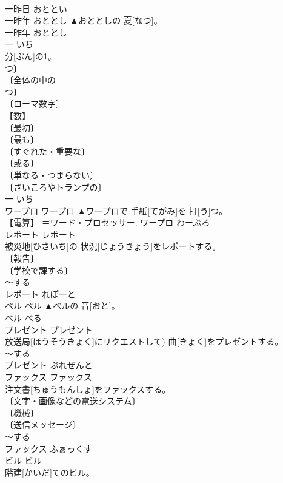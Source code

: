 \documentclass[8pt]{extreport}
\begin{document}
\begin{CJK}{UTF8}{min}
\\	[＝おととい]	一昨日	おととい	
\\	一昨年	おととし	▲おととしの 夏[なつ]。	
\\	一昨年	おととし	
\\	一	いち	
\\	分[ぶん]の1。	
\\	つ〕 
\\	〔全体の中の 
\\	つ〕 
\\	〔ローマ数字〕 
\\	【数】 
\\	〔最初〕 
\\	〔最も〕 
\\	〔すぐれた・重要な〕 
\\	〔或る〕 
\\	〔単なる・つまらない〕 
\\	〔さいころやトランプの〕 
\\	一	いち	
\\	ワープロ	ワープロ	▲ワープロで 手紙[てがみ]を 打[う]つ。	
\\	【電算】 ＝ワード・プロセッサー.	ワープロ	わーぷろ	
\\	レポート	レポート	
\\	被災地[ひさいち]の 状況[じょうきょう]をレポートする。	
\\	〔報告〕 
\\	〔学校で課する〕 
\\	～する 
\\	レポート	れぽーと	
\\	ベル	ベル	▲ベルの 音[おと]。	
\\	ベル	べる	
\\	プレゼント	プレゼント	
\\	放送局[ほうそうきょく]にリクエストして) 曲[きょく]をプレゼントする。	
\\	[＝おくりもの] ～する 
\\	プレゼント	ぷれぜんと	
\\	ファックス	ファックス	
\\	注文書[ちゅうもんしょ]をファックスする。	
\\	〔文字・画像などの電送システム〕 
\\	〔機械〕 
\\	〔送信メッセージ〕 
\\	～する 
\\	ファックス	ふぁっくす	
\\	ビル	ビル	
\\	階建[かいだ]てのビル。	

\end{CJK}
\end{document}
